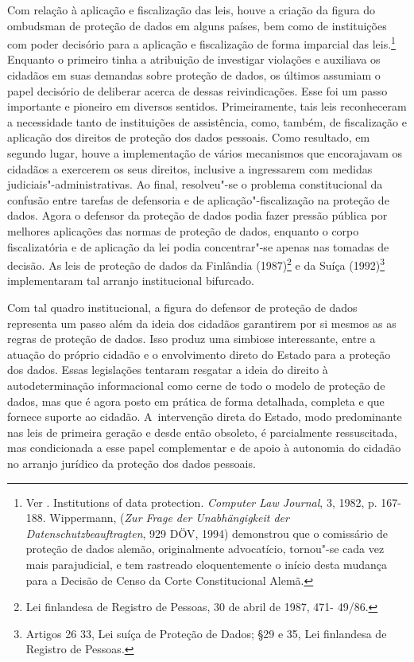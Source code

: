 Com relação à aplicação e fiscalização das leis, houve a criação da
figura do ombudsman de proteção de dados em alguns países, bem como de
instituições com poder decisório para a aplicação e fiscalização de
forma imparcial das leis.\footnote{Ver . Institutions of data
  protection. \emph{Computer Law Journal}, 3, 1982, p. 167-188.
  Wippermann, (\emph{Zur Frage der Unabhängigkeit der
  Datenschutzbeauftragten}, 929 DÖV, 1994) demonstrou que o comissário
  de proteção de dados alemão, originalmente advocatício, tornou"-se cada
  vez mais parajudicial, e tem rastreado eloquentemente o início desta
  mudança para a Decisão de Censo da Corte Constitucional Alemã.}
Enquanto o primeiro tinha a atribuição de investigar violações e
auxiliava os cidadãos em suas demandas sobre proteção de dados, os
últimos assumiam o papel decisório de deliberar acerca de dessas
reivindicações. Esse foi um passo importante e pioneiro em diversos
sentidos. Primeiramente, tais leis reconheceram a necessidade tanto de
instituições de assistência, como, também, de fiscalização e aplicação
dos direitos de proteção dos dados pessoais. Como resultado, em segundo
lugar, houve a implementação de vários mecanismos que encorajavam os
cidadãos a exercerem os seus direitos, inclusive a ingressarem com
medidas judiciais"-administrativas. Ao final, resolveu"-se o problema
constitucional da confusão entre tarefas de defensoria e de
aplicação"-fiscalização na proteção de dados. Agora o defensor da
proteção de dados podia fazer pressão pública por melhores aplicações
das normas de proteção de dados, enquanto o corpo fiscalizatória e de
aplicação da lei podia concentrar"-se apenas nas tomadas de decisão. As
leis de proteção de dados da Finlândia (1987)\footnote{Lei finlandesa de
  Registro de Pessoas, 30 de abril de 1987, 471- 49/86.} e da Suíça
(1992)\footnote{Artigos 26 33, Lei suíça de Proteção de Dados; §29 e 35,
  Lei finlandesa de Registro de Pessoas.} implementaram tal arranjo
institucional bifurcado.

Com tal quadro institucional, a figura do defensor de proteção de dados
representa um passo além da ideia dos cidadãos garantirem por si mesmos
as as regras de proteção de dados. Isso produz uma simbiose
interessante, entre a atuação do próprio cidadão e o envolvimento direto
do Estado para a proteção dos dados. Essas legislações tentaram resgatar
a ideia do direito à autodeterminação informacional como cerne de todo o
modelo de proteção de dados, mas que é agora posto em prática de forma
detalhada, completa e que fornece suporte ao cidadão. A~intervenção
direta do Estado, modo predominante nas leis de primeira geração e desde
então obsoleto, é parcialmente ressuscitada, mas condicionada a esse
papel complementar e de apoio à autonomia do cidadão no arranjo jurídico
da proteção dos dados pessoais.

